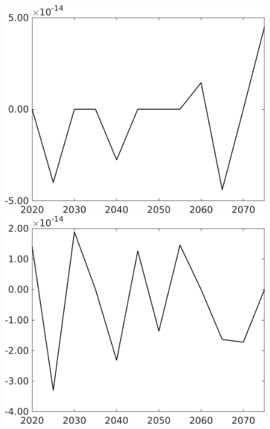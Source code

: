 \begin{figure}[h!!]
\begin{minipage}[]{0.32\textwidth}
\end{minipage}	
\begin{minipage}[]{0.32\textwidth}
\includegraphics[width=1\textwidth]{../../codding_model/own_basedOnFried/optimalPol_010922_revision/figures/all_13Sept22/CompTaul_Equlab_LFBAUPer_Reg0_pf_spillover0_nsk1_xgr1_knspil0_sep1_countec0_GovRev0_etaa0.79.png}
\end{minipage}
\begin{minipage}[]{0.32\textwidth}
\includegraphics[width=1\textwidth]{../../codding_model/own_basedOnFried/optimalPol_010922_revision/figures/all_13Sept22/CompTaul_Equlab_LFBAUPer_Reg0_pg_spillover0_nsk1_xgr1_knspil0_sep1_countec0_GovRev0_etaa0.79.png}
\end{minipage}
\end{figure}


